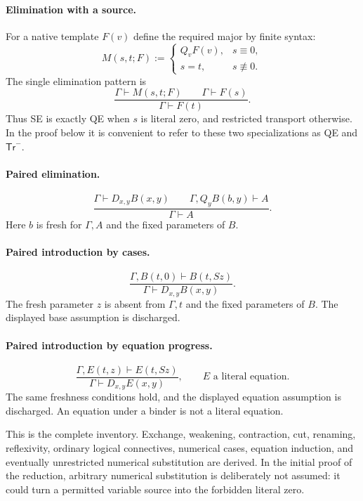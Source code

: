 \documentclass[11pt]{article}
\theoremstyle{definition}\newtheorem{definition}[theorem]{Definition}
\theoremstyle{remark}\newtheorem{remark}[theorem]{Remark}
\newcommand{\synneq}{\not\equiv}
\begin{document}
\paragraph{Elimination with a source.}
For a native template $F(v)$ define the required major by finite syntax:
\[
 M(s,t;F):=
 \begin{cases}
  Q_vF(v),&s\equiv0,\\
  s=t,&s\synneq0.
 \end{cases}
\]
The single elimination pattern is
\[
 \frac{\Gamma\vdash M(s,t;F)\qquad\Gamma\vdash F(s)}
      {\Gamma\vdash F(t)}.                 \tag{SE}
\]
Thus SE is exactly QE when $s$ is literal zero, and restricted transport
otherwise. In the proof below it is convenient to refer to these two
specializations as QE and $\mathsf{Tr}^{-}$.

\paragraph{Paired elimination.}
\[
 \frac{\Gamma\vdash D_{x,y}B(x,y)\qquad
       \Gamma,Q_yB(b,y)\vdash A}
      {\Gamma\vdash A}.                   \tag{DE}
\]
Here $b$ is fresh for $\Gamma,A$ and the fixed parameters of $B$.

\paragraph{Paired introduction by cases.}
\[
 \frac{\Gamma,B(t,0)\vdash B(t,Sz)}
      {\Gamma\vdash D_{x,y}B(x,y)}.        \tag{DI-case}
\]
The fresh parameter $z$ is absent from $\Gamma,t$ and the fixed parameters
of $B$. The displayed base assumption is discharged.

\paragraph{Paired introduction by equation progress.}
\[
 \frac{\Gamma,E(t,z)\vdash E(t,Sz)}
      {\Gamma\vdash D_{x,y}E(x,y)},
       \qquad E\text{ a literal equation}.\tag{DI-progress}
\]
The same freshness conditions hold, and the displayed equation assumption
is discharged. An equation under a binder is not a literal equation.

This is the complete inventory. Exchange, weakening, contraction, cut,
renaming, reflexivity, ordinary logical connectives, numerical cases,
equation induction, and eventually unrestricted numerical substitution
are derived. In the initial proof of the reduction, arbitrary numerical
substitution is deliberately not assumed: it could turn a permitted variable
source into the forbidden literal zero.
\end{document}
